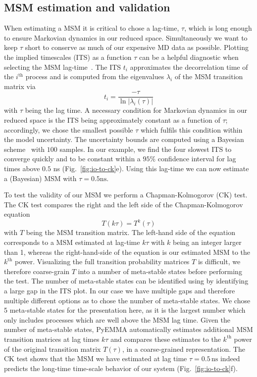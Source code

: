 \documentclass[9pt,tutorial]{livecoms}
\begin{document}
\subsection{MSM estimation and validation}
When estimating a MSM it is critical to chose a lag-time, $\tau$, which is long enough to ensure Markovian dynamics in our reduced space. Simultaneously we want to keep $\tau$ short to conserve as much of our expensive MD data as possible. Plotting the implied timescales (ITS) as a function $\tau$ can be a helpful diagnostic when selecting the MSM lag-time~\cite{swope-its}. The ITS $t_i$ approximates the decorrelation time of the $i^\textrm{th}$ process and is computed from the eigenvalues $\lambda_i$ of the MSM transition matrix via
\begin{equation}
\label{eq:its}
t_i = \frac{-\tau}{\ln\left|\lambda_i(\tau)\right|}
\end{equation}
with $\tau$ being the lag time.
A necessary condition for Markovian dynamics in our reduced space is the ITS being approximately constant as a function of $\tau$; accordingly, we chose the smallest possible $\tau$ which fulfils this condition within the model uncertainty. The uncertainty bounds are computed using a Bayesian scheme~\cite{ben-rev-msm,noe-tmat-sampling} with $100$ samples.
In our example, we find the four slowest ITS to converge quickly and to be constant within a $95\%$ confidence interval for lag times above $0.5$ ns (Fig.~\ref{fig:io-to-ck}e). Using this lag-time we can now estimate a (Bayesian) MSM with $\tau=0.5\mathrm{ns}$. 

To test the validity of our MSM we perform a Chapman-Kolmogorov (CK) test. The CK test compares the right and the left side of the Chapman-Kolmogorov equation
\begin{equation}
\label{eq:ck}
T(k \tau) = T^k(\tau)
\end{equation}
with $T$ being the MSM transition matrix. The left-hand side of the equation corresponds to a MSM estimated at lag-time $k\tau$ with $k$ being an integer larger than 1, whereas the right-hand-side of the equation is our estimated MSM to the $k^\textrm{th}$ power. Visualizing the full transition probability matrices $T$ is difficult, we therefore coarse-grain $T$ into a number of meta-stable states before performing the test. The number of meta-stable states can be identified using by identifying a large gap in the ITS plot. In our case we have multiple gaps and therefore multiple different options as to chose the number of meta-stable states. We chose 5 meta-stable states for the presentation here, as it is the largest number which only includes processes which are well above the MSM lag time.
Given the number of meta-stable states, PyEMMA automatically estimates additional MSM transition matrices at lag times $k \tau$ and compares these estimates to the $k^\textrm{th}$ power of the original transition matrix $T(\tau)$, in a coarse-grained representation.
The CK test shows that the MSM we have estimated at lag time $\tau=0.5\,\mathrm{ns}$ indeed predicts the long-time time-scale behavior of our system (Fig.~\ref{fig:io-to-ck}f).
\end{document}

